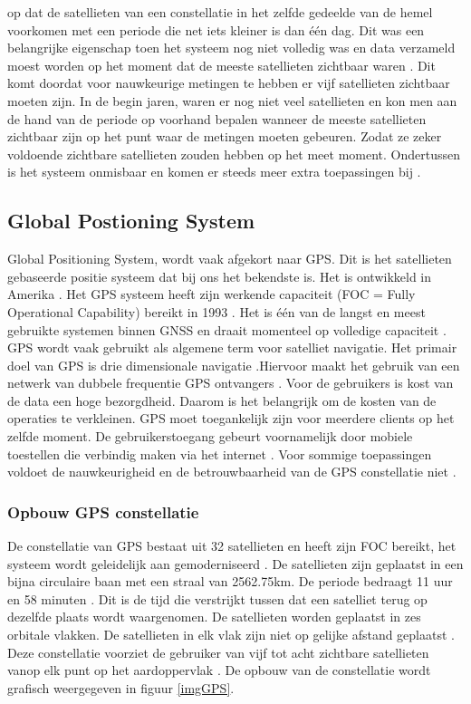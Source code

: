 op dat de satellieten van een constellatie in het zelfde gedeelde van de hemel voorkomen met een periode die net iets kleiner is dan \'e\'en dag. Dit was een belangrijke eigenschap toen het systeem nog niet volledig was en data verzameld moest worden op het moment dat de meeste satellieten zichtbaar waren \cite{LBibGNSS7}. Dit komt doordat voor nauwkeurige metingen te hebben er vijf satellieten zichtbaar moeten zijn. In de begin jaren, waren er nog niet veel satellieten en kon men aan de hand van de periode op voorhand bepalen wanneer de meeste satellieten zichtbaar zijn op het punt waar de metingen moeten gebeuren. Zodat ze zeker voldoende zichtbare satellieten zouden hebben op het meet moment. Ondertussen is het systeem onmisbaar en komen er steeds meer extra toepassingen bij \cite{LBibGNSS8}.

\subsection{Global Postioning System}
\label{LGPS} 
Global Positioning System, wordt vaak afgekort naar GPS. Dit is het satellieten gebaseerde positie systeem dat bij ons het bekendste is. Het is ontwikkeld in Amerika \cite{LBibGNSS, LBibGNSS3}. Het GPS systeem heeft zijn werkende capaciteit (FOC = Fully Operational Capability) bereikt in 1993 \cite{LBibGPS4}. Het is \'e\'en van de langst en meest gebruikte systemen binnen GNSS en draait momenteel op volledige capaciteit \cite{LBibGNSS4,LBibGNSS8}. GPS wordt vaak gebruikt als algemene term voor satelliet navigatie. Het primair doel van GPS is drie dimensionale navigatie \cite{LBibGNSS8}.Hiervoor maakt het gebruik van een netwerk van dubbele frequentie GPS ontvangers \cite{LBibGPS5}. Voor de gebruikers is kost van de data een hoge bezorgdheid. Daarom is het belangrijk om de kosten van de operaties te verkleinen. GPS moet toegankelijk zijn voor meerdere clients op het zelfde moment. De gebruikerstoegang gebeurt voornamelijk door mobiele toestellen die verbindig maken via het internet \cite{LBibGPS}. Voor sommige toepassingen voldoet de nauwkeurigheid en de betrouwbaarheid van de GPS constellatie niet \cite{LBibGNSS6}.

\subsubsection{Opbouw GPS constellatie}
 De constellatie van GPS bestaat uit 32 satellieten en heeft zijn FOC bereikt, het systeem wordt geleidelijk aan gemoderniseerd \cite{LBibGNSS4}. De satellieten zijn geplaatst in een bijna circulaire baan met een straal van 2562.75km. De periode bedraagt 11 uur en 58 minuten \cite{LBibGNSS6,LBibGNSS8}. Dit is de tijd die verstrijkt tussen dat een satelliet terug op dezelfde plaats wordt waargenomen. De satellieten worden geplaatst in zes orbitale vlakken. De satellieten in elk vlak zijn niet op gelijke afstand geplaatst \cite{LBibGNSS6}. Deze constellatie voorziet de gebruiker van vijf tot acht zichtbare satellieten vanop elk punt op het aardoppervlak \cite{LBibGNSS8}. De opbouw van de constellatie wordt grafisch weergegeven in figuur \ref{imgGPS}.
 
